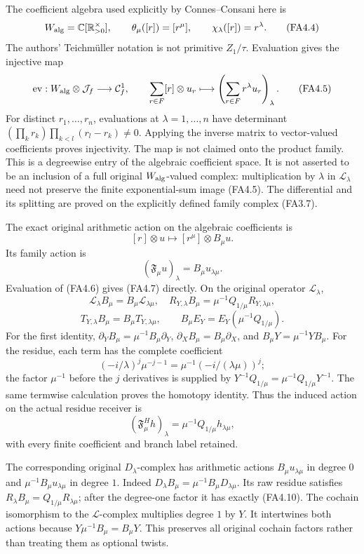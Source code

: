 The coefficient algebra used explicitly by Connes--Consani here is \[
 W_{\rm alg}=\mathbb C[\mathbb R_{>0}^{\times}],
 \qquad \theta_\mu([r])=[r^\mu],\qquad
 \chi_\lambda([r])=r^\lambda.
\tag{FA4.4}
\] The authors' Teichmüller notation is not primitive \(Z_1/\tau\).
Evaluation gives the injective map \[
 \operatorname{ev}:W_{\rm alg}\otimes\mathcal J_f
   \longrightarrow\mathcal C^1_f,\qquad
 \sum_{r\in F}[r]\otimes u_r
      \longmapsto\left(\sum_{r\in F}r^\lambda u_r\right)_\lambda.
\tag{FA4.5}
\] For distinct \(r_1,\ldots,r_n\), evaluations at
\(\lambda=1,\ldots,n\) have determinant
\((\prod_k r_k)\prod_{k<l}(r_l-r_k)\ne0\). Applying the inverse matrix
to vector-valued coefficients proves injectivity. The map is not claimed
onto the product family. This is a degreewise entry of the algebraic
coefficient space. It is not asserted to be an inclusion of a full
original \(W_{\rm alg}\)-valued complex: multiplication by \(\lambda\)
in \(\mathcal L_\lambda\) need not preserve the finite exponential-sum
image (FA4.5). The differential and its splitting are proved on the
explicitly defined family complex (FA3.7).

The exact original arithmetic action on the algebraic coefficients is \[
 [r]\otimes u\longmapsto[r^\mu]\otimes B_\mu u.
\tag{FA4.6}
\] Its family action is \[
 (\mathfrak F_\mu u)_\lambda=B_\mu u_{\lambda\mu}.
\tag{FA4.7}
\] Evaluation of (FA4.6) gives (FA4.7) directly. On the original
operator \(\mathcal L_\lambda\), \[
 \mathcal L_\lambda B_\mu=B_\mu\mathcal L_{\lambda\mu},
\quad
 R_{Y,\lambda}B_\mu
    =\mu^{-1}Q_{1/\mu}R_{Y,\lambda\mu},
\tag{FA4.8}
\] \[
 T_{Y,\lambda}B_\mu=B_\mu T_{Y,\lambda\mu},\qquad
 B_\mu E_Y=E_Y(\mu^{-1}Q_{1/\mu}).
\tag{FA4.9}
\] For the first identity, \(\partial_YB_\mu=\mu^{-1}B_\mu\partial_Y\),
\(\partial_XB_\mu=B_\mu\partial_X\), and \(B_\mu Y=\mu^{-1}YB_\mu\). For
the residue, each term has the complete coefficient \[
 (-i/\lambda)^j\mu^{-j-1}
     =\mu^{-1}(-i/(\lambda\mu))^j;
\] the factor \(\mu^{-1}\) before the \(j\) derivatives is supplied by
\(Y^{-1}Q_{1/\mu}=\mu^{-1}Q_{1/\mu}Y^{-1}\). The same termwise
calculation proves the homotopy identity. Thus the induced action on the
actual residue receiver is \[
 (\mathfrak F_\mu^H h)_\lambda
       =\mu^{-1}Q_{1/\mu}h_{\lambda\mu},
\tag{FA4.10}
\] with every finite coefficient and branch label retained.

The corresponding original \(D_\lambda\)-complex has arithmetic actions
\(B_\mu u_{\lambda\mu}\) in degree \(0\) and
\(\mu^{-1}B_\mu u_{\lambda\mu}\) in degree \(1\). Indeed
\(D_\lambda B_\mu=\mu^{-1}B_\mu D_{\lambda\mu}\). Its raw residue
satisfies \(R_\lambda B_\mu
=Q_{1/\mu}R_{\lambda\mu}\); after the degree-one factor it has exactly
(FA4.10). The cochain isomorphism to the \(\mathcal L\)-complex
multiplies degree \(1\) by \(Y\). It intertwines both actions because
\(Y\mu^{-1}B_\mu=B_\mu Y\). This preserves all original cochain factors
rather than treating them as optional twists.


